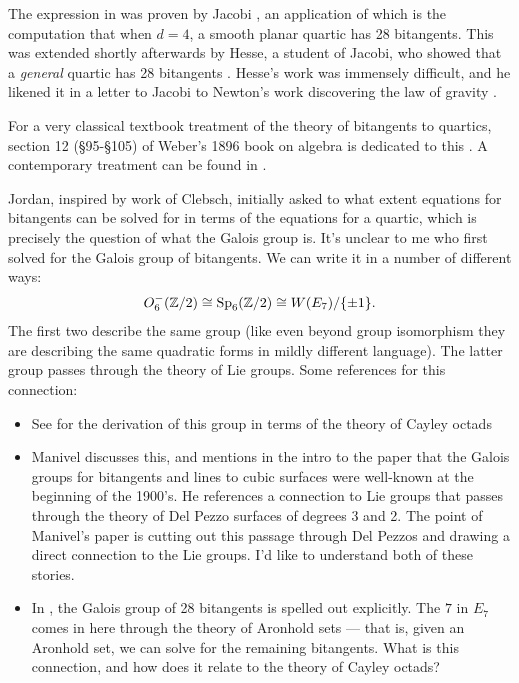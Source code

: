 \documentclass[11pt]{amsart}
\begin{document}
The expression in  was proven by Jacobi \cite{Jacobi1850}, an application of which is the computation that when $d=4$, a smooth planar quartic has 28 bitangents. This was extended shortly afterwards by Hesse, a student of Jacobi, who showed that a \textit{general} quartic has 28 bitangents \cite{Hesse1855}. Hesse's work was immensely difficult, and he likened it in a letter to Jacobi to Newton's work discovering the law of gravity \cite[p.~165]{Gray-worlds}.

For a very classical textbook treatment of the theory of bitangents to quartics, section 12 (\S95-\S105) of Weber's 1896 book on algebra is dedicated to this \cite[\S95-\S105]{Weber1896}. A contemporary treatment can be found in \cite[\S6.1]{Dolgachev}.

Jordan, inspired by work of Clebsch, initially asked to what extent equations for bitangents can be solved for in terms of the equations for a quartic, which is precisely the question of what the Galois group is. It's unclear to me who first solved for the Galois group of bitangents. We can write it in a number of different ways:
\begin{align*}
    O_6^-(\mathbb{Z}/2) \cong \mathrm{Sp}_6(\mathbb{Z}/2) \cong W(E_7)/\{\pm 1\}.
\end{align*}
The first two describe the same group (like even beyond group isomorphism they are describing the same quadratic forms in mildly different language). The latter group passes through the theory of Lie groups. Some references for this connection:
\begin{itemize}
    \item See \cite[Theorem~9]{DolgachevOrtland} for the derivation of this group in terms of the theory of Cayley octads
    \item Manivel \cite{Manivel2006} discusses this, and mentions in the intro to the paper that the Galois groups for bitangents and lines to cubic surfaces were well-known at the beginning of the 1900's. He references a connection to Lie groups that passes through the theory of Del Pezzo surfaces of degrees 3 and 2. The point of Manivel's paper is cutting out this passage through Del Pezzos and drawing a direct connection to the Lie groups. I'd like to understand both of these stories.
    \item In \cite[p.~367]{MillerBlichfeldtDickson}, the Galois group of 28 bitangents is spelled out explicitly. The $7$ in $E_7$ comes in here through the theory of Aronhold sets --- that is, given an Aronhold set, we can solve for the remaining bitangents. What is this connection, and how does it relate to the theory of Cayley octads?
\end{itemize}
\end{document}

